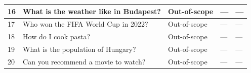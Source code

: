 \begin{longtable}{|p{}|p{}|p{}|p{}|p{}|}
    16 &
    What is the weather like in Budapest? &
    Out-of-scope &
    — &
    — \\
    \hline

    17 &
    Who won the FIFA World Cup in 2022? &
    Out-of-scope &
    — &
    — \\
    \hline

    18 &
    How do I cook pasta? &
    Out-of-scope &
    — &
    — \\
    \hline

    19 &
    What is the population of Hungary? &
    Out-of-scope &
    — &
    — \\
    \hline

    20 &
    Can you recommend a movie to watch? &
    Out-of-scope &
    — &
    — \\
    \hline

\end{longtable}